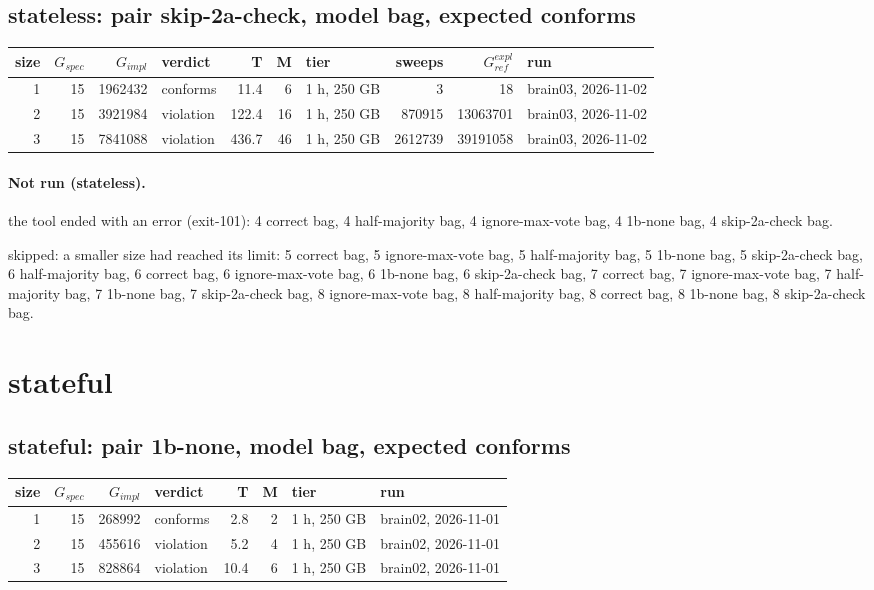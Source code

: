 \documentclass[10pt]{article}
\begin{document}
\subsection*{stateless: pair \textsf{skip-2a-check}, model bag, expected conforms}
\begin{longtable}{@{}rrrlrrlrrl@{}}
\toprule
size & $G_{\mathit{spec}}$ & $G_{\mathit{impl}}$ & verdict & T & M & tier & sweeps & $G_{\mathit{ref}}^{\mathit{expl}}$ & run \\
\midrule
\endhead
\color{blue} 1 & 15 & 1962432 & conforms & 11.4 & 6 & 1 h, 250 GB & 3 & 18 & brain03, 2026-11-02 \\
\color{blue} 2 & 15 & 3921984 & violation & 122.4 & 16 & 1 h, 250 GB & 870915 & 13063701 & brain03, 2026-11-02 \\
\color{blue} 3 & 15 & 7841088 & violation & 436.7 & 46 & 1 h, 250 GB & 2612739 & 39191058 & brain03, 2026-11-02 \\
\bottomrule
\end{longtable}
\paragraph{Not run (stateless).}
the tool ended with an error (exit-101): 4 correct bag, 4 half-majority bag, 4 ignore-max-vote bag, 4 1b-none bag, 4 skip-2a-check bag.\par
skipped: a smaller size had reached its limit: 5 correct bag, 5 ignore-max-vote bag, 5 half-majority bag, 5 1b-none bag, 5 skip-2a-check bag, 6 half-majority bag, 6 correct bag, 6 ignore-max-vote bag, 6 1b-none bag, 6 skip-2a-check bag, 7 correct bag, 7 ignore-max-vote bag, 7 half-majority bag, 7 1b-none bag, 7 skip-2a-check bag, 8 ignore-max-vote bag, 8 half-majority bag, 8 correct bag, 8 1b-none bag, 8 skip-2a-check bag.\par
\section*{stateful}
\subsection*{stateful: pair \textsf{1b-none}, model bag, expected conforms}
\begin{longtable}{@{}rrrlrrll@{}}
\toprule
size & $G_{\mathit{spec}}$ & $G_{\mathit{impl}}$ & verdict & T & M & tier & run \\
\midrule
\endhead
\color{blue} 1 & 15 & 268992 & conforms & 2.8 & 2 & 1 h, 250 GB & brain02, 2026-11-01 \\
\color{blue} 2 & 15 & 455616 & violation & 5.2 & 4 & 1 h, 250 GB & brain02, 2026-11-01 \\
\color{blue} 3 & 15 & 828864 & violation & 10.4 & 6 & 1 h, 250 GB & brain02, 2026-11-01 \\
\bottomrule
\end{longtable}
\end{document}
